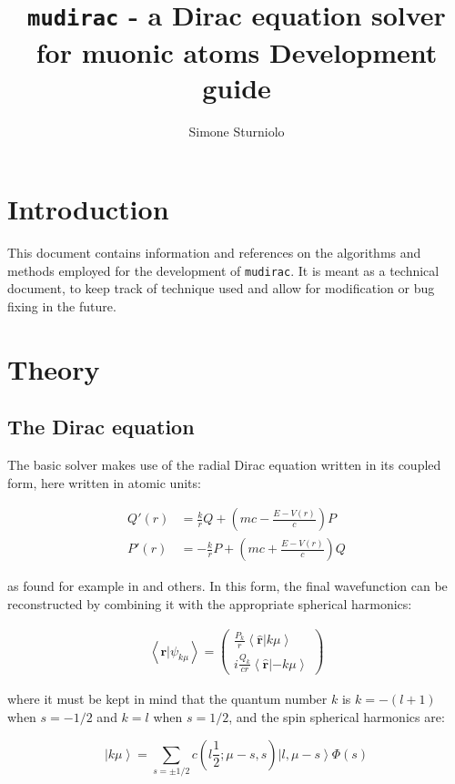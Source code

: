 \documentclass[]{report}
\title{\texttt{mudirac} - a Dirac equation solver for muonic atoms
	\newline
	\large Development guide}
\author{Simone Sturniolo}
\begin{document}
\maketitle

\chapter*{Introduction}

This document contains information and references on the algorithms and methods employed for the development of \texttt{mudirac}. It is meant as a technical document, to keep track of technique used and allow for modification or bug fixing in the future.

\chapter{Theory}

\section{The Dirac equation}

The basic solver makes use of the radial Dirac equation written in its coupled form, here written in atomic units:

\begin{align}\label{dirac_sys}
	Q'(r) &= \frac{k}{r}Q + \left(mc-\frac{E-V(r)}{c}\right)P \\
	P'(r) &= -\frac{k}{r}P + \left(mc+\frac{E-V(r)}{c}\right)Q
\end{align}

as found for example in \cite{weinb2008, silbar2010} and others. In this form, the final wavefunction can be reconstructed by combining it with the appropriate spherical harmonics:

\begin{align}
\left<\mathbf{r}|\psi_{k\mu}\right> = \begin{pmatrix}
\frac{P_k}{r}\left<\mathbf{\hat{r}}|k\mu\right> \\
i\frac{Q_k}{cr}\left<\mathbf{\hat{r}}|-k\mu\right>
\end{pmatrix}
\end{align}

where it must be kept in mind that the quantum number $k$ is $k=-(l+1)$ when $s = -1/2$ and $k=l$ when $s=1/2$, and the spin spherical harmonics are:

\begin{equation}
\left|k\mu\right> = \sum_{s=\pm 1/2} c(l\frac{1}{2};\mu-s, s)\left|l,\mu-s\right>\Phi(s)
\end{equation}
\end{document}
